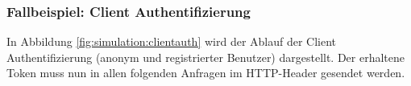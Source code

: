 \subsubsection{Fallbeispiel: Client Authentifizierung}\label{sec:simulation:clientauth}
In Abbildung \ref{fig:simulation:clientauth} wird der Ablauf der Client Authentifizierung (anonym und registrierter Benutzer) dargestellt. Der erhaltene Token muss nun in allen folgenden Anfragen im HTTP-Header gesendet werden.  
\vspace*{\fill}
\begin{center}
    \label{fig:simulation:clientauth}
\end{center}
\vspace*{\fill}

\newpage
